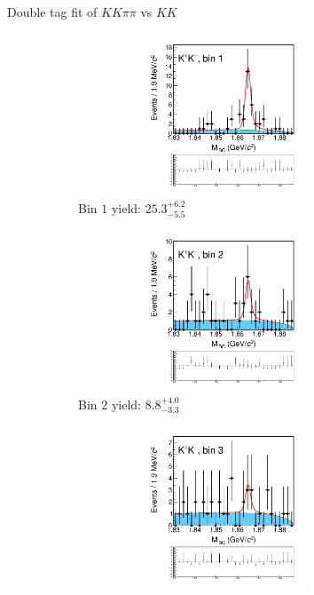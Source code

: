\documentclass{beamer}
\begin{document}
\begin{frame}{Double tag fit of $KK\pi\pi$ vs $KK$}
  \begin{figure}
    \centering
    \begin{subfigure}{0.5\textwidth}
      \centering
      \includegraphics[width=0.75\textwidth,trim={0 5cm 0 0},clip=true]{Plots/DoubleTagYield_DoubleTag_CP_KKpipi_vs_KK_SignalBin1.pdf}
      \caption{Bin $1$ yield: $25.3_{-5.5}^{+6.2}$}
    \end{subfigure}%
    \begin{subfigure}{0.5\textwidth}
      \centering
      \includegraphics[width=0.75\textwidth,trim={0 5cm 0 0},clip=true]{Plots/DoubleTagYield_DoubleTag_CP_KKpipi_vs_KK_SignalBin2.pdf}
      \caption{Bin $2$ yield: $8.8_{-3.3}^{+4.0}$}
    \end{subfigure}
    \begin{subfigure}{0.5\textwidth}
      \centering
      \includegraphics[width=0.75\textwidth,trim={0 5cm 0 0},clip=true]{Plots/DoubleTagYield_DoubleTag_CP_KKpipi_vs_KK_SignalBin3.pdf}

\end{subfigure}
\end{figure}
\end{frame}
\end{document}
